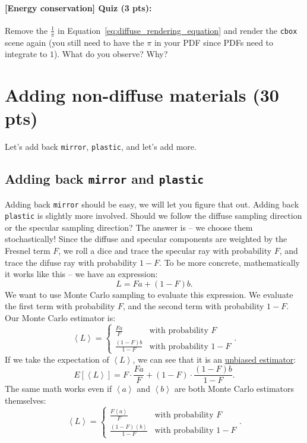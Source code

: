 \paragraph{[Energy conservation] Quiz (3 pts):} Remove the $\frac{1}{\pi}$ in Equation~\eqref{eq:diffuse_rendering_equation} and render the \lstinline{cbox} scene again (you still need to have the $\pi$ in your PDF since PDFs need to integrate to $1$). What do you observe? Why?

\section{Adding non-diffuse materials (30 pts)}
Let's add back \lstinline{mirror}, \lstinline{plastic}, and let's add more. 

\subsection{Adding back \protect\lstinline!mirror! and \protect\lstinline!plastic!}
Adding back \lstinline{mirror} should be easy, we will let you figure that out. Adding back \lstinline{plastic} is slightly more involved. Should we follow the diffuse sampling direction or the specular sampling direction? The answer is -- we choose them stochastically! Since the diffuse and specular components are weighted by the Fresnel term $F$, we roll a dice and trace the specular ray with probability $F$, and trace the difuse ray with probability $1-F$. To be more concrete, mathematically it works like this -- we have an expression:
\begin{equation}
L = F a + (1 - F) b.
\end{equation}
We want to use Monte Carlo sampling to evaluate this expression. We evaluate the first term with probability $F$, and the second term with probability $1-F$. Our Monte Carlo estimator is:
\begin{equation}
\left<L\right> = \begin{cases}
\frac{F a}{F} & \text{with probability } F \\
\frac{\left(1 - F\right) b}{1 - F} & \text{with probability } 1 - F
\end{cases}.
\label{eq:discrete_mc}
\end{equation}
If we take the expectation of $\left<L\right>$, we can see that it is an \href{https://en.wikipedia.org/wiki/Bias_of_an_estimator}{unbiased estimator}:
\begin{equation}
E\left[\left<L\right>\right] = F \cdot \frac{F a}{F} + (1 - F) \cdot \frac{(1 - F) b}{1 - F}.
\end{equation}
The same math works even if $\left<a\right>$ and $\left<b\right>$ are both Monte Carlo estimators themselves:
\begin{equation}
\left<L\right> = \begin{cases}
\frac{F \left<a\right>}{F} & \text{with probability } F \\
\frac{\left(1 - F\right) \left<b\right>}{1 - F} & \text{with probability } 1 - F
\end{cases}.
\end{equation}

